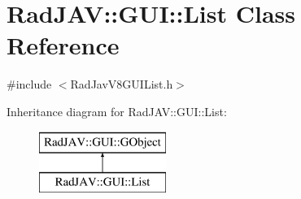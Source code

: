 \hypertarget{class_rad_j_a_v_1_1_g_u_i_1_1_list}{}\section{Rad\+J\+AV\+:\+:G\+UI\+:\+:List Class Reference}
\label{class_rad_j_a_v_1_1_g_u_i_1_1_list}


{\ttfamily \#include $<$Rad\+Jav\+V8\+G\+U\+I\+List.\+h$>$}

Inheritance diagram for Rad\+J\+AV\+:\+:G\+UI\+:\+:List\+:\begin{figure}[H]
\begin{center}
\leavevmode
\includegraphics[height=2.000000cm]{class_rad_j_a_v_1_1_g_u_i_1_1_list}
\end{center}
\end{figure}
